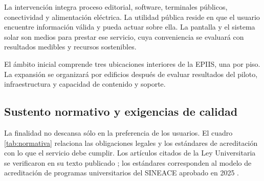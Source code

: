La intervención integra proceso editorial, software, terminales públicos, conectividad y alimentación eléctrica. La utilidad pública reside en que el usuario encuentre información válida y pueda actuar sobre ella. La pantalla y el sistema solar son medios para prestar ese servicio, cuya conveniencia se evaluará con resultados medibles y recursos sostenibles.

El ámbito inicial comprende tres ubicaciones interiores de la EPIIS, una por piso. La expansión se organizará por edificios después de evaluar resultados del piloto, infraestructura y capacidad de contenido y soporte.

\subsection{Sustento normativo y exigencias de calidad}
La finalidad no descansa sólo en la preferencia de los usuarios. El cuadro \ref{tab:normativa} relaciona las obligaciones legales y los estándares de acreditación con lo que el servicio debe cumplir. Los artículos citados de la Ley Universitaria se verificaron en su texto publicado \cite{ley30220}; los estándares corresponden al modelo de acreditación de programas universitarios del SINEACE aprobado en 2025 \cite{sineace2025}.

